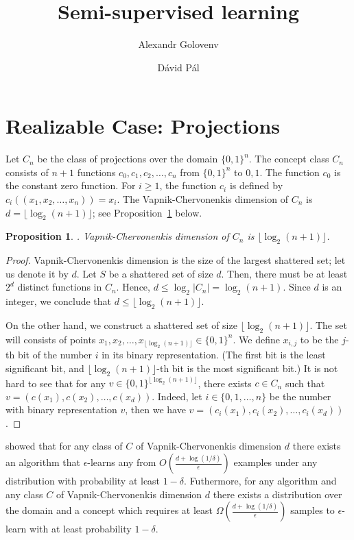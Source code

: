 \documentclass[12pt]{article}
\title{Semi-supervised learning}
\author{Alexandr Golovenv \and D\'avid P\'al}
\newtheorem{proposition}{Proposition}
\begin{document}
\maketitle

\section{Realizable Case: Projections}

Let $C_n$ be the class of projections over the domain $\{0,1\}^n$. The concept
class $C_n$ consists of $n+1$ functions $c_0, c_1, c_2, \dots, c_n$ from
$\{0,1\}^n$ to ${0,1}$. The function $c_0$ is the constant zero function. For $i
\ge 1$, the function $c_i$ is defined by $c_i((x_1, x_2, \dots, x_n)) = x_i$.
The Vapnik-Chervonenkis dimension of $C_n$ is $d = \lfloor \log_2(n+1) \rfloor$;
see Proposition~\ref{proposition:vc-dimension-projections} below.

\begin{proposition}
\label{proposition:vc-dimension-projections}.
Vapnik-Chervonenkis dimension of $C_n$ is $\lfloor \log_2(n+1) \rfloor$.
\end{proposition}

\begin{proof}
Vapnik-Chervonenkis dimension is the size of the largest shattered set; let us
denote it by $d$. Let $S$ be a shattered set of size $d$. Then, there must be at
least $2^d$ distinct functions in $C_n$. Hence, $d \le \log_2 |C_n| =
\log_2(n+1)$. Since $d$ is an integer, we conclude that $d \le \lfloor \log_2(n+1)
\rfloor$.

On the other hand, we construct a shattered set of size $\lfloor \log_2(n+1)
\rfloor$. The set will consists of points $x_1, x_2, \dots, x_{\lfloor
\log_2(n+1) \rfloor} \in \{0,1\}^n$. We define $x_{i,j}$ to be the $j$-th bit of
the number $i$ in its binary representation. (The first bit is the least
significant bit, and $\lfloor \log_2(n+1) \rfloor$-th bit is the most significant
bit.) It is not hard to see that for any $v \in \{0,1\}^{\lfloor \log_2(n+1)
\rfloor}$, there exists $c \in C_n$ such that $v = (c(x_1), c(x_2), \dots,
c(x_d))$. Indeed, let $i \in \{0,1,\dots,n\}$ be the number with binary
representation $v$, then we have $v = (c_i(x_1), c_i(x_2), \dots, c_i(x_d))$.
\end{proof}

\cite{Hanneke-2016} showed that for any class of $C$ of Vapnik-Chervonenkis
dimension $d$ there exists an algorithm that $\epsilon$-learns any from
$O\left(\frac{d + \log(1/\delta)}{\epsilon}\right)$ examples under any
distribution with probability at least $1-\delta$. Futhermore, for any algorithm
and any class $C$ of Vapnik-Chervonenkis dimension $d$ there exists a
distribution over the domain and a concept which requires at least $\Omega
\left(\frac{d + \log(1/\delta)}{\epsilon}\right)$ samples to $\epsilon$-learn
with at least probability $1 - \delta$.
\end{document}
